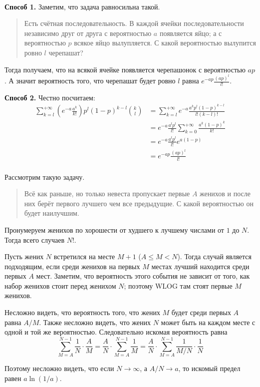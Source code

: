 \documentclass[12pt,a4paper]{article}
\begin{document}
    \begin{problem}{7}\ 
        
        \textbf{Способ 1.} Заметим, что задача равносильна такой.
        \begin{quotation}
            Есть счётная последовательность. В каждой ячейки последовательности независимо друг от друга с вероятностью $a$ появляется яйцо; а с вероятностью $p$ всякое яйцо вылупляется. С какой вероятностью вылупится ровно $l$ черепашат?
        \end{quotation}
        Тогда получаем, что на всякой ячейке появляется черепашонок с вероятностью $ap$. А значит вероятность того, что черепашат будет ровно $l$ равна $e^{-ap} \frac{(ap)^l}{l!}$.

        \textbf{Способ 2.} Честно посчитаем:
        \begin{align*}
            \sum_{k=l}^{+\infty} \left(e^{-a} \frac{a^k}{k!}\right) p^l (1-p)^{k-l} \binom{k}{l}
            &= \sum_{k=l}^{+\infty} e^{-a} \frac{a^k p^l (1-p)^{k-l}}{l! (k-l)!}\\
            &= e^{-a} \frac{a^l p^l}{l!}\sum_{k=0}^{+\infty} \frac{a^k (1-p)^k}{k!}\\
            &= e^{-a} \frac{a^l p^l}{l!} e^{a(1-p)}\\
            &= e^{-ap} \frac{(ap)^l}{l!}\\
        \end{align*}
    \end{problem}

    \begin{problem}{9}
        Рассмотрим такую задачу.
        \begin{quotation}
            Всё как раньше, но только невеста пропускает первые $A$ женихов и после них берёт первого лучшего чем все предыдущие. С какой вероятностью он будет наилучшим.
        \end{quotation}
        Пронумеруем женихов по хорошести от худшего к лучшему числами от $1$ до $N$. Тогда всего случаев $N!$.
        
        Пусть жених $N$ встретился на месте $M + 1$ ($A \leqslant M < N$). Тогда случай является подходящим, если среди женихов на первых $M$ местах лучший находится среди первых $A$ мест. Заметим, что вероятность этого события не зависит от того, как набор женихов стоит перед женихом $N$; поэтому WLOG там стоят первые $M$ женихов.

        Несложно видеть, что вероятность того, что жених $M$ будет среди первых $A$ равна $A/M$. Также несложно видеть, что жених $N$ может быть на каждом месте с одной и той же вероятностью. Следовательно искомая вероятность равна
        \[\sum_{M = A}^{N-1} \frac{1}{N} \cdot \frac{A}{M} = \frac{A}{N} \cdot \sum_{M=A}^{N-1} \frac{1}{M} = \frac{A}{N} \cdot \sum_{M=A}^{N-1} \frac{1}{M/N} \cdot \frac{1}{N}\]

        Поэтому несложно видеть, что если $N \to \infty$, а $A/N \to a$, то искомый предел равен $a\ln(1/a)$.
    \end{problem}
\end{document}
